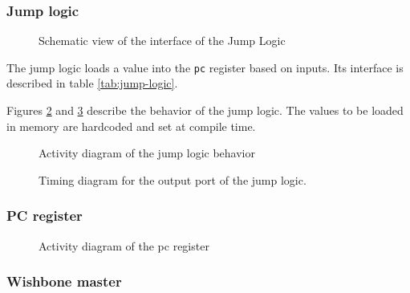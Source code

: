 \subsubsection{Jump logic}

\begin{figure}[H]
    \centering
    
    \caption{Schematic view of the interface of the Jump Logic}
    \label{fig:jump-logic}
\end{figure}

\begin{content}
  The jump logic loads a value into the \texttt{pc} register based on inputs. Its interface is described in table \ref{tab:jump-logic}.
\end{content}



\begin{content}
\end{content}

\begin{content}
  Figures \ref{fig:jump-logic-behavior} and \ref{fig:jump-logic-output} describe the behavior of the jump logic. The values to be loaded in memory are hardcoded and set at compile time.
\end{content}

\begin{figure}[H]
    \centering
    
    \caption{Activity diagram of the jump logic behavior}
    \label{fig:jump-logic-behavior}
\end{figure}

\begin{figure}[H]
    \centering
    
    \caption{Timing diagram for the output port of the jump logic.}
    \label{fig:jump-logic-output}
\end{figure}

\subsubsection{PC register}

\begin{figure}[H]
    \centering
    
    \caption{Activity diagram of the pc register}
    \label{fig:pc-behavior}
\end{figure}

\subsubsection{Wishbone master}

